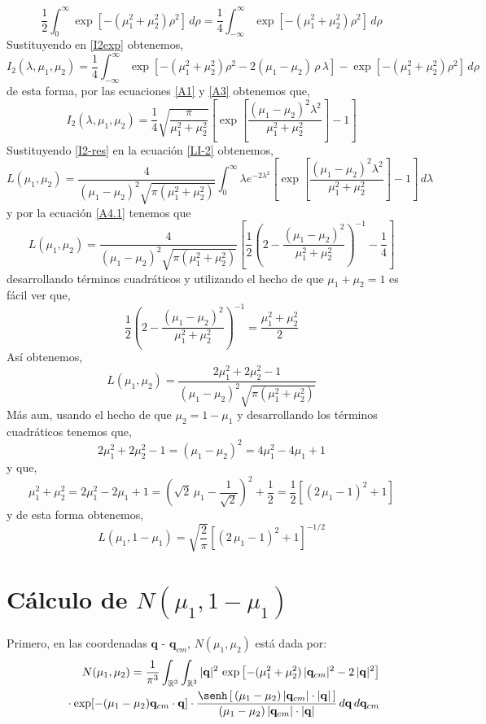 \documentclass[12pt]{book}
\numberwithin{equation}{chapter}
\def\q{\mathbf{q}}
\def\R{\mathbb{R}}
\def\r{\rho}
\def\l{\lambda}
\begin{document}
$$\frac{1}{2} \int_{0}^{\infty} \exp[-(\mu_{1}^{2}+\mu_{2}^{2})\r^{2}] \, d\r= \frac{1}{4} \int_{-\infty}^{\infty} \exp[-(\mu_{1}^{2}+\mu_{2}^{2})\r^{2}] \, d\r $$
Sustituyendo en \eqref{I2exp} obtenemos,
$$I_{2}(\l ,\mu_{1},\mu_{2})=\frac{1}{4} \int_{-\infty}^{\infty} \exp[-(\mu_{1}^{2}+\mu_{2}^{2})\r^{2}- 2(\mu_{1}-\mu_{2})\, \r \, \l  ] - \exp [ -(\mu_{1}^{2}+\mu_{2}^{2})\r^{2} ]\, d\r $$  
de esta forma, por las ecuaciones \eqref{A1} y \eqref{A3} obtenemos que,
\begin{equation}\label{I2-res}
I_{2}(\l ,\mu_{1},\mu_{2})=\frac{1}{4} \sqrt{ \frac{\pi}{\mu_{1}^{2}+\mu_{2}^{2}}} \left[ \exp\left[ \frac{(\mu_{1}-\mu_{2})^{2} \l^{2}}{\mu_{1}^{2}+\mu_{2}^{2}} \right] - 1 \right] 
\end{equation}
Sustituyendo \eqref{I2-res} en la ecuaci\'on \eqref{LI-2} obtenemos,
$$ L(\mu_{1},\mu_{2})=\frac{4}{(\mu_{1}-\mu_{2})^{2} \sqrt{\pi(\mu_{1}^{2}+\mu_{2}^{2}) }} \int_{0}^{\infty} \l e^{-2\l^{2}} \left[ \exp\left[ \frac{(\mu_{1}-\mu_{2})^{2} \l^{2}}{\mu_{1}^{2}+\mu_{2}^{2}} \right] - 1 \right] \, d\l $$
y por la ecuaci\'on \eqref{A4.1} tenemos que
$$ L(\mu_{1},\mu_{2})= \frac{4}{(\mu_{1}-\mu_{2})^{2} \sqrt{\pi(\mu_{1}^{2}+\mu_{2}^{2}) }} \left[\frac{1}{2} \left(2-\frac{(\mu_{1}-\mu_{2})^{2}}{\mu_{1}^{2}+\mu_{2}^{2}} \right)^{-1} -\frac{1}{4} \right] $$
desarrollando t\'erminos cuadr\'aticos y utilizando el hecho de que $\mu_{1}+\mu_{2}=1$ es f\'acil ver que,
$$ \frac{1}{2} \left(2-\frac{(\mu_{1}-\mu_{2})^{2}}{\mu_{1}^{2}+\mu_{2}^{2}} \right)^{-1}= \frac{ \mu_{1}^{2}+\mu_{2}^{2} }{2} $$
As\'i obtenemos,
$$ L(\mu_{1},\mu_{2})= \frac{ 2\mu_{1}^{2}+2\mu_{2}^{2}-1 }{(\mu_{1}-\mu_{2})^{2} \sqrt{\pi(\mu_{1}^{2}+\mu_{2}^{2}) }} $$
M\'as aun, usando el hecho de que $\mu_{2}=1-\mu_{1}$ y desarrollando los t\'erminos cuadr\'aticos tenemos que,
$$2\mu_{1}^{2}+2\mu_{2}^{2}-1= (\mu_{1}-\mu_{2})^{2}= 4\mu_{1}^{2} -4 \mu_{1}+1 $$
y que,
$$ \mu_{1}^{2}+\mu_{2}^{2}= 2\mu_{1}^{2} -2 \mu_{1}+1= \left(\sqrt{2}\, \mu_{1} - \frac{1}{\sqrt{2}} \right)^{2} +\frac{1}{2} = \frac{1}{2} \left[ \left(2\, \mu_{1} - 1 \right)^{2} + 1 \right] $$
y de esta forma obtenemos,
$$ L(\mu_{1},1-\mu_{1})= \sqrt{\frac{2}{\pi}}  \left[ (2\, \mu_{1} - 1)^{2} +1 \right]^{-1/2} $$


\chapter{C\'alculo de $N(\mu_{1},1-\mu_{1})$}
Primero, en las coordenadas $\q$ - $\q_{cm}$, $N(\mu_{1},\mu_{2})$ est\'a dada por: 
\begin{align}\label{L}
N(\mu_{1},\mu_{2})= 
\frac{1}{\pi^{3}}  \int_{\R^{3}} \int_{\R^{3}}
|\q|^{2}\, \exp \left[ -(\mu_{1}^{2}+\mu_{2}^{2})\, |\q_{cm}|^{2} - 2\,|\q|^{2}
 \right] 
\nonumber\\
\qquad  \vphantom{\int_{\R^{6}}}
\cdot \exp[ -(\mu_{1}-\mu_{2})\q_{cm}\cdot \q ] 
\cdot \frac{ \senh \left[\, (\mu_{1}-\mu_{2})\, |\q_{cm}|\cdot |\q| \, \right]}{ (\mu_{1}-\mu_{2})\, |\q_{cm}|\cdot |\q| }
\,d\q \, d\q_{cm} 
\end{align}
\end{document}
